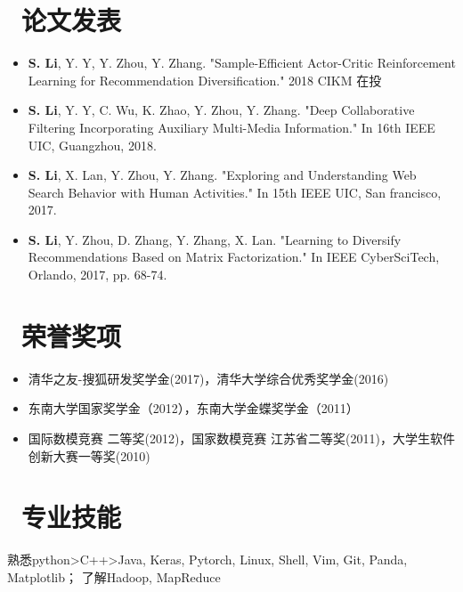 \documentclass{resume}
\begin{document}
\section{\faBook\ 论文发表}
\begin{itemize}
	\item \textbf{S. Li}, Y. Y, Y. Zhou, Y. Zhang. "Sample-Efficient Actor-Critic Reinforcement Learning for Recommendation Diversification." 2018 CIKM 在投
	\item \textbf{S. Li}, Y. Y, C. Wu, K. Zhao, Y. Zhou, Y. Zhang. "Deep Collaborative Filtering Incorporating Auxiliary Multi-Media Information." In 16th IEEE UIC, Guangzhou, 2018.
	\item \textbf{S. Li}, X. Lan, Y. Zhou, Y. Zhang. "Exploring and Understanding Web Search Behavior with Human Activities." In 15th IEEE UIC, San francisco, 2017.
	\item \textbf{S. Li}, Y. Zhou, D. Zhang, Y. Zhang, X. Lan. "Learning to Diversify Recommendations Based on Matrix Factorization." In IEEE CyberSciTech, Orlando, 2017, pp. 68-74.
\end{itemize}

\section{\faTrophy\ 荣誉奖项}
\begin{itemize}[parsep=0.5ex]
	\item 清华之友-搜狐研发奖学金(2017)，清华大学综合优秀奖学金(2016) 
	\item 东南大学国家奖学金（2012），东南大学金蝶奖学金（2011）
	\item 国际数模竞赛 二等奖(2012)，国家数模竞赛 江苏省二等奖(2011)，大学生软件创新大赛一等奖(2010)
\end{itemize}

\section{\faCogs\ 专业技能}
熟悉python>C++>Java, Keras, Pytorch, Linux, Shell, Vim, Git, Panda, Matplotlib； 了解Hadoop, MapReduce
\end{document}
